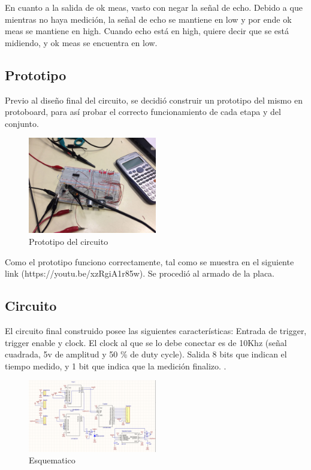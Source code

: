 \documentclass[../../e3_tp2_main.tex]{subfiles}
\begin{document}
En cuanto a la salida de ok meas, vasto con negar la señal de echo. Debido a que mientras no haya medición, la señal de echo se mantiene en low y por ende ok meas se mantiene en high. Cuando echo está en high, quiere decir que se está midiendo, y ok meas se encuentra en low.
\subsection{Prototipo}
Previo al diseño final del circuito, se decidió construir un prototipo del mismo en protoboard, para así probar el correcto funcionamiento de cada etapa y del conjunto. 
\begin{figure}[H]	
	\centering
	\includegraphics[angle=180,width=0.5\textwidth]{imagenes/prototipo.jpeg}
	\caption{Prototipo del circuito}
\end{figure}
Como el prototipo funciono correctamente, tal como se muestra en el siguiente link (https://youtu.be/xzRgiA1r85w). Se procedió al armado de la placa.
\subsection{Circuito}

El circuito final construido posee las siguientes características:
Entrada de trigger, trigger enable y clock. El clock al que se lo debe conectar es de 10Khz (señal cuadrada, 5v de amplitud y 50 \% de duty cycle).
Salida 8 bits que indican el tiempo medido, y 1 bit que indica que la medición finalizo.
.
\begin{figure}[H]	
	\centering
	\includegraphics[width=0.5\textwidth]{imagenes/esquematico.png}
	\caption{Esquematico}
\end{figure}
\end{document}

